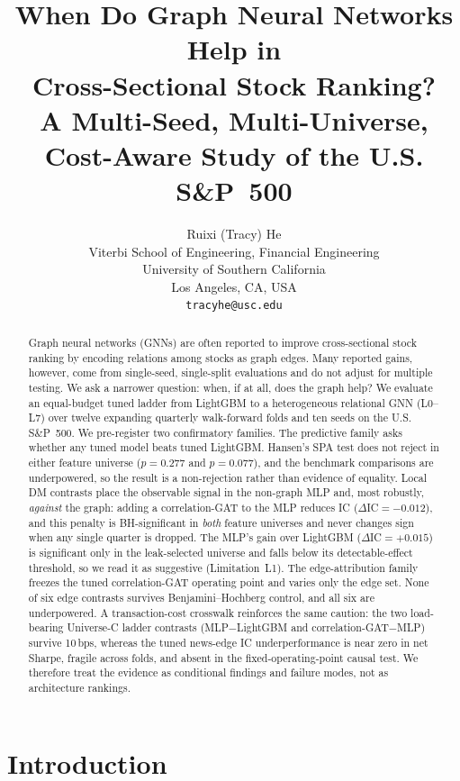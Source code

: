 \documentclass{article}
\title{When Do Graph Neural Networks Help in\\ Cross-Sectional Stock Ranking?\\
A Multi-Seed, Multi-Universe, Cost-Aware Study of the U.S. S\&P~500}
\author{Ruixi (Tracy) He \\
Viterbi School of Engineering, Financial Engineering \\
University of Southern California \\
Los Angeles, CA, USA \\
\texttt{tracyhe@usc.edu}
}
\begin{document}
\maketitle

\begin{abstract}
Graph neural networks (GNNs) are often reported to improve cross-sectional stock ranking by encoding relations among stocks as graph edges. Many reported gains, however, come from single-seed, single-split evaluations and do not adjust for multiple testing. We ask a narrower question: when, if at all, does the graph help? We evaluate an equal-budget tuned ladder from LightGBM to a heterogeneous relational GNN (L0--L7) over twelve expanding quarterly walk-forward folds and ten seeds on the U.S. S\&P~500. We pre-register two confirmatory families. The predictive family asks whether any tuned model beats tuned LightGBM. Hansen's SPA test does not reject in either feature universe ($p=0.277$ and $p=0.077$), and the benchmark comparisons are underpowered, so the result is a non-rejection rather than evidence of equality. Local DM contrasts place the observable signal in the non-graph MLP and, most robustly, \emph{against} the graph: adding a correlation-GAT to the MLP reduces IC ($\Delta$IC${}=-0.012$), and this penalty is BH-significant in \emph{both} feature universes and never changes sign when any single quarter is dropped. The MLP's gain over LightGBM ($\Delta$IC${}=+0.015$) is significant only in the leak-selected universe and falls below its detectable-effect threshold, so we read it as suggestive (Limitation~L1). The edge-attribution family freezes the tuned correlation-GAT operating point and varies only the edge set. None of six edge contrasts survives Benjamini--Hochberg control, and all six are underpowered. A transaction-cost crosswalk reinforces the same caution: the two load-bearing Universe-C ladder contrasts (MLP$-$LightGBM and correlation-GAT$-$MLP) survive 10\,bps, whereas the tuned news-edge IC underperformance is near zero in net Sharpe, fragile across folds, and absent in the fixed-operating-point causal test. We therefore treat the evidence as conditional findings and failure modes, not as architecture rankings.
\end{abstract}

\section{Introduction}\label{sec:intro}
\end{document}
